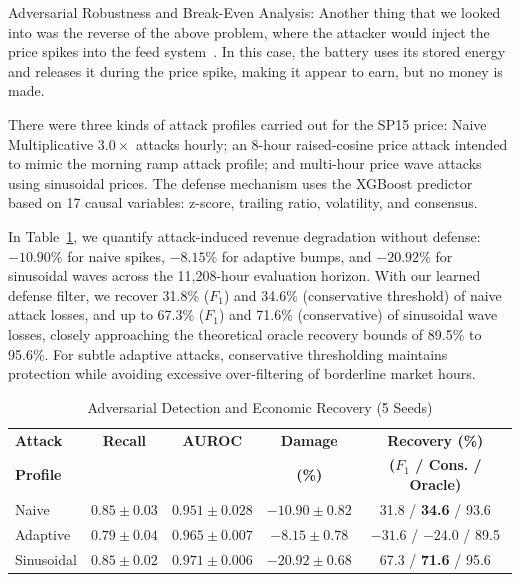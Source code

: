 \documentclass[journal]{IEEEtran}
\begin{document}
Adversarial Robustness and Break-Even Analysis: Another thing that we looked into was the reverse of the above problem, where the attacker would inject the price spikes into the feed system~\cite{Kurt_FDI_Detection}. In this case, the battery uses its stored energy and releases it during the price spike, making it appear to earn, but no money is made.

There were three kinds of attack profiles carried out for the SP15 price: Naive Multiplicative $3.0 \times$ attacks hourly; an 8-hour raised-cosine price attack intended to mimic the morning ramp attack profile; and multi-hour price wave attacks using sinusoidal prices. The defense mechanism uses the XGBoost predictor~\cite{XGBoost} based on 17 causal variables: z-score, trailing ratio, volatility, and consensus.

In Table~\ref{tab:adv_detect}, we quantify attack-induced revenue degradation without defense: $-10.90\%$ for naive spikes, $-8.15\%$ for adaptive bumps, and $-20.92\%$ for sinusoidal waves across the 11,208-hour evaluation horizon. With our learned defense filter, we recover 31.8\% ($F_1$) and 34.6\% (conservative threshold) of naive attack losses, and up to 67.3\% ($F_1$) and 71.6\% (conservative) of sinusoidal wave losses, closely approaching the theoretical oracle recovery bounds of 89.5\% to 95.6\%. For subtle adaptive attacks, conservative thresholding maintains protection while avoiding excessive over-filtering of borderline market hours.

\begin{table}[!t]
\centering
\caption{Adversarial Detection and Economic Recovery (5 Seeds)}
\label{tab:adv_detect}
\scriptsize
\renewcommand{\arraystretch}{1.15}
\setlength{\tabcolsep}{0.6pt}
\begin{tabular*}{\columnwidth}{@{\extracolsep{\fill}}lcccc}
\toprule
\textbf{Attack} & \textbf{Recall} & \textbf{AUROC} & \textbf{Damage} & \textbf{Recovery (\%)} \\
\textbf{Profile} & & & \textbf{(\%)} & \textbf{($F_1$ / Cons. / Oracle)} \\
\midrule
Naive & $0.85\pm 0.03$ & $0.951\pm 0.028$ & $-10.90\pm 0.82$ & 31.8 / \textbf{34.6} / 93.6 \\
Adaptive & $0.79\pm 0.04$ & $0.965\pm 0.007$ & $-8.15\pm 0.78$ & $-31.6$ / $-24.0$ / 89.5 \\
Sinusoidal & $0.85\pm 0.02$ & $0.971\pm 0.006$ & $-20.92\pm 0.68$ & 67.3 / \textbf{71.6} / 95.6 \\
\bottomrule
\end{tabular*}
\end{table}
\end{document}
